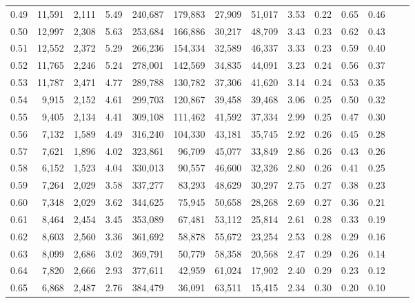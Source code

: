 \begin{tabular}{rrrrrrrrrrrrrr}
0.49 &  11,591 &  2,111 &    5.49 &  240,687 &  179,883 &  27,909 &  51,017 &  3.53 &  0.22 &  0.65 &      0.46 \\
0.50 &  12,997 &  2,308 &    5.63 &  253,684 &  166,886 &  30,217 &  48,709 &  3.43 &  0.23 &  0.62 &      0.43 \\
0.51 &  12,552 &  2,372 &    5.29 &  266,236 &  154,334 &  32,589 &  46,337 &  3.33 &  0.23 &  0.59 &      0.40 \\
0.52 &  11,765 &  2,246 &    5.24 &  278,001 &  142,569 &  34,835 &  44,091 &  3.23 &  0.24 &  0.56 &      0.37 \\
0.53 &  11,787 &  2,471 &    4.77 &  289,788 &  130,782 &  37,306 &  41,620 &  3.14 &  0.24 &  0.53 &      0.35 \\
0.54 &   9,915 &  2,152 &    4.61 &  299,703 &  120,867 &  39,458 &  39,468 &  3.06 &  0.25 &  0.50 &      0.32 \\
0.55 &   9,405 &  2,134 &    4.41 &  309,108 &  111,462 &  41,592 &  37,334 &  2.99 &  0.25 &  0.47 &      0.30 \\
0.56 &   7,132 &  1,589 &    4.49 &  316,240 &  104,330 &  43,181 &  35,745 &  2.92 &  0.26 &  0.45 &      0.28 \\
0.57 &   7,621 &  1,896 &    4.02 &  323,861 &   96,709 &  45,077 &  33,849 &  2.86 &  0.26 &  0.43 &      0.26 \\
0.58 &   6,152 &  1,523 &    4.04 &  330,013 &   90,557 &  46,600 &  32,326 &  2.80 &  0.26 &  0.41 &      0.25 \\
0.59 &   7,264 &  2,029 &    3.58 &  337,277 &   83,293 &  48,629 &  30,297 &  2.75 &  0.27 &  0.38 &      0.23 \\
0.60 &   7,348 &  2,029 &    3.62 &  344,625 &   75,945 &  50,658 &  28,268 &  2.69 &  0.27 &  0.36 &      0.21 \\
0.61 &   8,464 &  2,454 &    3.45 &  353,089 &   67,481 &  53,112 &  25,814 &  2.61 &  0.28 &  0.33 &      0.19 \\
0.62 &   8,603 &  2,560 &    3.36 &  361,692 &   58,878 &  55,672 &  23,254 &  2.53 &  0.28 &  0.29 &      0.16 \\
0.63 &   8,099 &  2,686 &    3.02 &  369,791 &   50,779 &  58,358 &  20,568 &  2.47 &  0.29 &  0.26 &      0.14 \\
0.64 &   7,820 &  2,666 &    2.93 &  377,611 &   42,959 &  61,024 &  17,902 &  2.40 &  0.29 &  0.23 &      0.12 \\
0.65 &   6,868 &  2,487 &    2.76 &  384,479 &   36,091 &  63,511 &  15,415 &  2.34 &  0.30 &  0.20 &      0.10 \\

\end{tabular}
